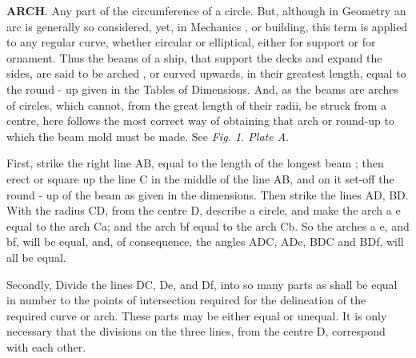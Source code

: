 \textbf{ARCH}. Any part of the circumference of a circle. But, although in Geometry an arc is generally so considered, yet, in Mechanics , or building, this term is applied to any regular curve, whether circular or elliptical, either for support or for ornament. Thus the beams of a ship, that support the decks and expand the sides, are said to be arched , or curved upwards, in their greatest length, equal to the round - up given in the Tables of Dimensions. And, as the beams are arches of circles, which cannot, from the great length of their radii, be struck from a centre, here follows the most correct way of obtaining that arch or round-up to which the beam mold must be made. See \textit{Fig. 1. Plate A}. 

First, strike the right line AB, equal to the length of the longest beam ; then erect or square up the line C in the middle of the line AB, and on it set-off the round - up of the beam as given in the dimensions. Then strike the lines AD, BD. With the radius CD, from the centre D, describe a circle, and make the arch a e equal to the arch Ca; and the arch bf equal to the arch Cb. So the arches a e, and bf, will be equal, and, of consequence, the angles ADC, ADe, BDC and BDf, will all be equal. 

Secondly, Divide the lines DC, De, and Df, into so many parts as shall be equal in number to the points of intersection required for the delineation of the required curve or arch. These parts may be either equal or unequal. It is only necessary that the divisions on the three lines, from the centre D, correspond with each other. 

